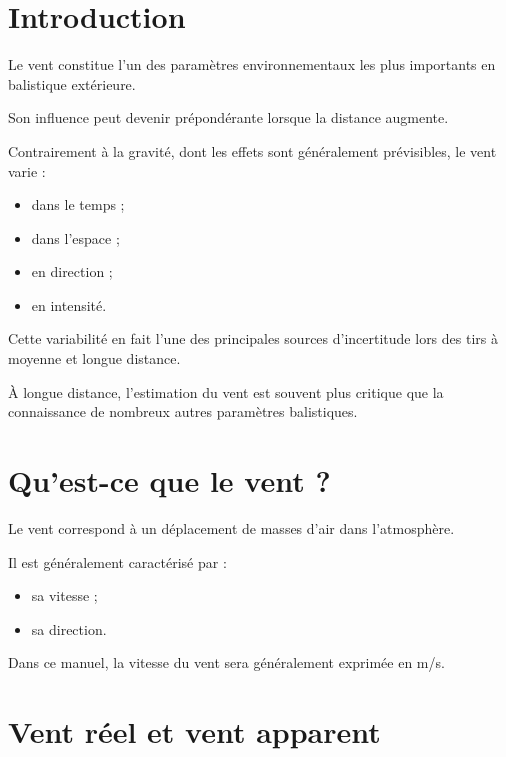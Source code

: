 
\section{Introduction}

Le vent constitue l'un des paramètres environnementaux les plus importants en
balistique extérieure.

Son influence peut devenir prépondérante lorsque la distance augmente.

Contrairement à la gravité, dont les effets sont généralement prévisibles,
le vent varie :

\begin{itemize}
\item dans le temps ;
\item dans l'espace ;
\item en direction ;
\item en intensité.
\end{itemize}

Cette variabilité en fait l'une des principales sources d'incertitude lors
des tirs à moyenne et longue distance.

\begin{aretenir}

À longue distance, l'estimation du vent est souvent plus critique que la
connaissance de nombreux autres paramètres balistiques.

\end{aretenir}

\section{Qu'est-ce que le vent ?}

Le vent correspond à un déplacement de masses d'air dans l'atmosphère.

Il est généralement caractérisé par :

\begin{itemize}
\item sa vitesse ;
\item sa direction.
\end{itemize}

Dans ce manuel, la vitesse du vent sera généralement exprimée en m/s.

\section{Vent réel et vent apparent}


